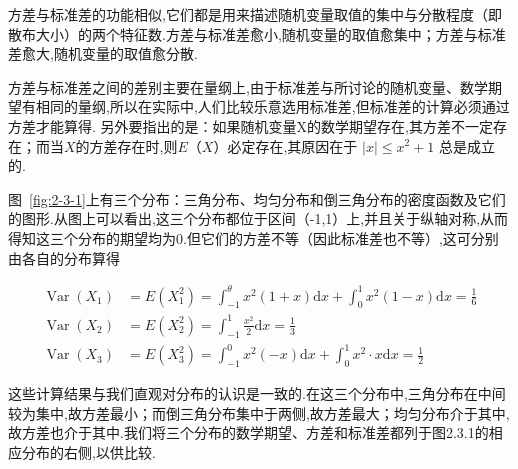 方差与标准差的功能相似,它们都是用来描述随机变量取值的集中与分散程度（即散布大小）的两个特征数.方差与标准差愈小,随机变量的取值愈集中；方差与标准差愈大,随机变量的取值愈分散.

方差与标准差之间的差别主要在量纲上,由于标准差与所讨论的随机变量、数学期望有相同的量纲,所以在实际中,人们比较乐意选用标准差,但标准差的计算必须通过方差才能算得.
另外要指出的是：如果随机变量X的数学期望存在,其方差不一定存在；而当$ X $的方差存在时,则$ E（X） $必定存在,其原因在于 $|x| \leqslant x^{2}+1$ 总是成立的.

\begin{example}
	图~\ref{fig:2-3-1}上有三个分布：三角分布、均匀分布和倒三角分布的密度函数及它们的图形.从图上可以看出,这三个分布都位于区间（-1,1）上,并且关于纵轴对称,从而得知这三个分布的期望均为0.但它们的方差不等（因此标准差也不等）,这可分别由各自的分布算得
	
	\[
	\begin{aligned}
	\operatorname{Var}\left(X_{1}\right)&=E\left(X_{1}^{2}\right)=\int_{-1}^{\theta} x^{2}(1+x) \mathrm{d} x+\int_{0}^{1} x^{2}(1-x) \mathrm{d} x=\frac{1}{6}\\
	\operatorname{Var}\left(X_{2}\right) &=E\left(X_{2}^{2}\right)=\int_{-1}^{1} \frac{x^{2}}{2} \mathrm{d} x=\frac{1}{3} \\ 
	\operatorname{Var}\left(X_{3}\right) &=E\left(X_{3}^{2}\right)=\int_{-1}^{0} x^{2}(-x) \mathrm{d} x+\int_{0}^{1} x^{2} \cdot x \mathrm{d} x=\frac{1}{2} 
	\end{aligned}
	\]
	
	这些计算结果与我们直观对分布的认识是一致的.在这三个分布中,三角分布在中间较为集中,故方差最小；而倒三角分布集中于两侧,故方差最大；均匀分布介于其中,故方差也介于其中.我们将三个分布的数学期望、方差和标准差都列于图2.3.1的相应分布的右侧,以供比较.
	
\end{example}


